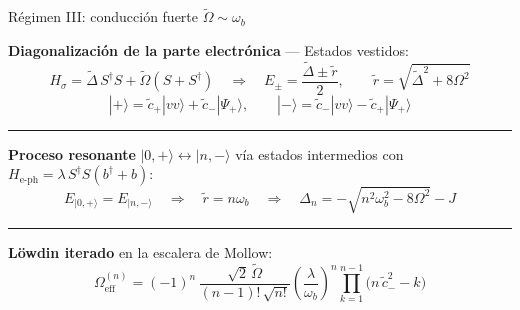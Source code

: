 \documentclass[
11pt,notheorems,hyperref={pdfauthor=whatever}
]{beamer}
\begin{document}
\begin{frame}{Régimen III: conducción fuerte \texorpdfstring{$\widetilde{\Omega} \sim \omega_b$}{}}
	
	\textbf{Diagonalización de la parte electrónica} — Estados vestidos:
	\begin{equation*}
		H_\sigma = \widetilde\Delta\,S^\dagger S + \widetilde\Omega(S+S^\dagger)
		\quad\Rightarrow\quad
		E_\pm = \frac{\widetilde\Delta \pm \tilde{r}}{2},
		\qquad
		\tilde{r} = \sqrt{\widetilde\Delta^2 + 8\Omega^2}
	\end{equation*}
	\begin{equation*}
		|{+}\rangle = \tilde{c}_+|vv\rangle + \tilde{c}_-|\Psi_+\rangle,
		\qquad
		|{-}\rangle = \tilde{c}_-|vv\rangle - \tilde{c}_+|\Psi_+\rangle
	\end{equation*}
	
	\vspace{4pt}
	\rule{\textwidth}{0.4pt}
	\vspace{2pt}
	
	\textbf{Proceso resonante} $|0,{+}\rangle \leftrightarrow |n,{-}\rangle$
	vía estados intermedios con $H_\mathrm{e\text{-}ph} = \lambda\,S^\dagger S(b^\dagger+b)$:
	\begin{equation*}
		E_{|0,+\rangle} = E_{|n,-\rangle}
		\quad\Rightarrow\quad
		\tilde{r} = n\omega_b
		\quad\Rightarrow\quad
		\boxed{\Delta_n = -\sqrt{n^2\omega_b^2 - 8\Omega^2} - J}
	\end{equation*}
	
	\vspace{4pt}
	\rule{\textwidth}{0.4pt}
	\vspace{2pt}
	
	\textbf{Löwdin iterado} en la escalera de Mollow:
	\begin{equation*}
		\boxed{
			\Omega_\mathrm{eff}^{(n)}
			= (-1)^n\,\frac{\sqrt{2}\,\widetilde\Omega}{(n-1)!\,\sqrt{n!}}
			\left(\frac{\lambda}{\omega_b}\right)^{\!n}
			\prod_{k=1}^{n-1}\!\bigl(n\,\tilde{c}_-^2 - k\bigr)
		}
	\end{equation*}
	
\end{frame}
\end{document}
